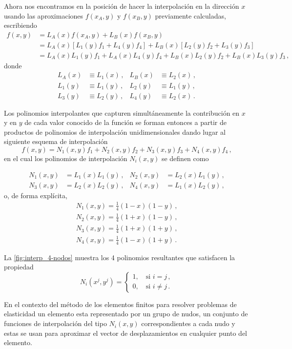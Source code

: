 Ahora nos encontramos en la posición de hacer la interpolación en la dirección 
$x$ usando las aproximaciones $f(x_A,y)$ y $f(x_B,y)$ previamente calculadas, 
escribiendo
\begin{align*}
  f(x,y) &= L_A(x) f(x_A,y) + L_B(x)f(x_B,y)\\
    &= L_A(x)[L_1(y)f_1 + L_4(y)f_4] + L_B(x)[L_2(y)f_2 + L_3(y)f_3]\\
    &= L_A(x)L_1(y)f_1 + L_A(x)L_4(y)f_4 + L_B(x)L_2(y)f_2 + L_B(x)L_3(y)f_3 \, 
    ,
\end{align*}
donde
\begin{align*}
L_A(x) & \equiv L_1(x)\, ,
&L_B(x) & \equiv L_2(x)\, ,\\
L_1(y) & \equiv L_1(y)\, ,
&L_2(y) & \equiv L_1(y)\, ,\\
L_3(y) & \equiv L_2(y)\, ,
& L_4(y) & \equiv L_2(x) \, .
\end{align*}

Los polinomios interpolantes que capturen simultáneamente la contribución en $x$ y en $y$ de cada valor conocido de la función  se forman entonces a partir de productos de polinomios de interpolación unidimensionales dando lugar al siguiente esquema de interpolación
\[f(x,y) = N_1(x,y)f_1 + N_2(x,y)f_2 + N_3(x,y)f_3 + N_4(x,y)f_4\, ,\]
en el cual los polinomios de interpolación $N_i(x,y)$ se definen como

\begin{align*}
N_1(x,y) & = L_1(x)L_1(y)\, ,
&N_2(x,y) & = L_2(x)L_1(y)\, ,\\
N_3(x,y) & = L_2(x)L_2(y)\, ,
&N_4(x,y) & = L_1(x)L_2(y)\, ,
\end{align*}
o, de forma explícita,
\begin{align*}
N_1(x, y) = \frac{1}{4}(1 - x)(1 - y)\, ,\\
N_2(x, y) = \frac{1}{4}(1 + x)(1 - y)\, ,\\
N_3(x, y) = \frac{1}{4}(1 + x)(1 + y)\, ,\\
N_4(x, y) = \frac{1}{4}(1 - x)(1 + y)\, .
\end{align*}


La \cref{fig:interp_4-nodos} muestra los 4 polinomios resultantes que satisfacen la propiedad 
\[N_i (x^j, y^j) = \begin{cases}
1,\quad \text{si } i = j\, ,\\
0,\quad \text{si } i \neq j\, .
\end{cases}\]

\begin{tcolorbox}
En el contexto del método de los elementos finitos para resolver problemas de elasticidad un elemento esta representado por un grupo de nudos, un conjunto de funciones de interpolación del tipo $N_i(x, y)$ correspondientes a cada nudo y estas se usan para aproximar el vector de desplazamientos en cualquier punto del elemento.
\end{tcolorbox}

